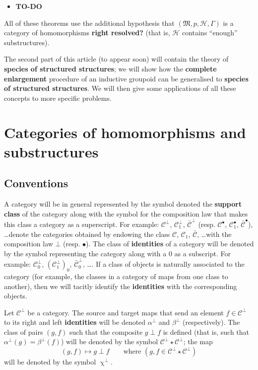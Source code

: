 \documentclass{article}
\newcommand{\todo}{{\color{purple}\textbf{TO-DO }}}
\newcommand{\unsure}[1]{{\color{purple}\textbf{#1}}}
\newcommand{\CC}{\mathcal{C}}
\newcommand{\HH}{\mathcal{H}}
\newcommand{\MM}{\mathfrak{M}}
\newcommand{\dotc}{{\mathbin{\bullet}}}
\newcommand{\botc}{{\mathbin{\bot}}}
\newcommand{\comp}{\upchi}
\begin{document}
\begin{itemize}
  \item \todo
\end{itemize}

All of these theorems use the additional hypothesis that $(\MM,p,\HH,\Gamma)$ is a category of homomorphisms \unsure{right resolved?} (that is, $\HH$ contains ``enough'' substructures).

The second part of this article (to appear soon) will contain the theory of \unsure{species of structured structures};
we will show how the \unsure{complete enlargement} procedure of an inductive groupoid can be generalised to \unsure{species of structured structures}.
We will then give some applications of all these concepts to more specific problems.



\section{Categories of homomorphisms and substructures}

\subsection{Conventions}

A category will be in general represented by the symbol denoted the \unsure{support class} of the category along with the symbol for the composition law that makes this class a category as a superscript.
For example: $\CC^\botc$, $\CC_1^\botc$, $\bar{\CC}^\botc$ (resp. $\CC^\dotc$, $\CC_1^\dotc$, $\bar{\CC}^\dotc$), \ldots denote the categories obtained by endowing the class $\CC$, $\CC_1$, $\bar{\CC}$, \ldots with the composition law $\botc$ (resp. $\dotc$).
The class of \unsure{identities} of a category will be denoted by the symbol representing the category along with a $0$ as a subscript.
For example: $\CC_0^\botc$, $(\CC_1^\botc)_0$, $\bar{\CC}_0^\botc$, \ldots.
If a class of objects is naturally associated to the category (for example, the classes in a category of maps from one class to another), then we will tacitly identify the \unsure{identities} with the corresponding objects.

Let $\CC^\botc$ be a category.
The source and target maps that send an element $f\in\CC^\botc$ to its right and left \unsure{identities} will be denoted $\alpha^\botc$ and $\beta^\botc$ (respectively).
The class of pairs $(g,f)$ such that the composite $g\botc f$ is defined (that is, such that $\alpha^\botc(g)=\beta^\botc(f)$) will be denoted by the symbol $\CC^\botc\star\CC^\botc$;
the map
\[
  (g,f) \mapsto g\botc f
  \qquad\text{where }(g,f\in\CC^\botc\star\CC^\botc)
\]
will be denoted by the symbol $\comp^\botc$.
\end{document}

